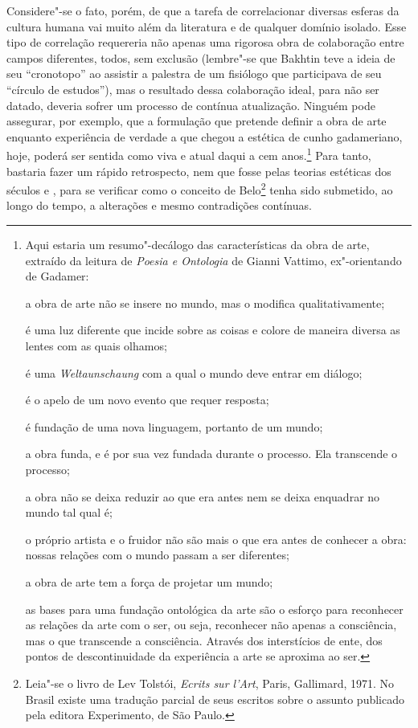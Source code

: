 Considere"-se o fato, porém, de que a tarefa de correlacionar diversas
esferas da cultura humana vai muito além da literatura e de qualquer
domínio isolado. Esse tipo de correlação requereria não apenas uma
rigorosa obra de colaboração entre campos diferentes, todos, sem
exclusão (lembre"-se que Bakhtin teve a ideia de seu ``cronotopo'' ao
assistir a palestra de um fisiólogo que participava de seu ``círculo de
estudos''), mas o resultado dessa colaboração ideal, para não ser
datado, deveria sofrer um processo de contínua atualização. Ninguém pode
assegurar, por exemplo, que a formulação que pretende definir a obra de
arte enquanto experiência de verdade a que chegou a estética de cunho
gadameriano, hoje, poderá ser sentida como viva e atual daqui a cem
anos.\footnote{Aqui estaria um resumo"-decálogo das características da
  obra de arte, extraído da leitura de \emph{Poesia e Ontologia} de
  Gianni Vattimo, ex"-orientando de Gadamer:

  a obra de arte não se insere no mundo, mas o modifica
  qualitativamente;

  é uma luz diferente que incide sobre as coisas e colore de maneira
  diversa as lentes com as quais olhamos;

  é uma \emph{Weltaunschaung} com a qual o mundo deve entrar em diálogo;

  é o apelo de um novo evento que requer resposta;

  é fundação de uma nova linguagem, portanto de um mundo;

  a obra funda, e é por sua vez fundada durante o processo. Ela
  transcende o processo;

  a obra não se deixa reduzir ao que era antes nem se deixa enquadrar no
  mundo tal qual é;

  o próprio artista e o fruidor não são mais o que era antes de
  conhecer a obra: nossas relações com o mundo passam a ser diferentes;

  a obra de arte tem a força de projetar um mundo;

  as bases para uma fundação ontológica da arte são o esforço para
  reconhecer as relações da arte com o ser, ou seja, reconhecer não
  apenas a consciência, mas o que transcende a consciência. Através dos
  interstícios de ente, dos pontos de descontinuidade da experiência a
  arte se aproxima ao ser.} Para tanto, bastaria fazer um rápido
retrospecto, nem que fosse pelas teorias estéticas dos séculos  e ,
para se verificar como o conceito de Belo\footnote{Leia"-se o livro de
  Lev Tolstói, \emph{Ecrits sur l'Art}, Paris, Gallimard, 1971. No
  Brasil existe uma tradução parcial de seus escritos sobre o assunto
  publicado pela editora Experimento, de São Paulo.} tenha sido
submetido, ao longo do tempo, a alterações e mesmo contradições
contínuas.

